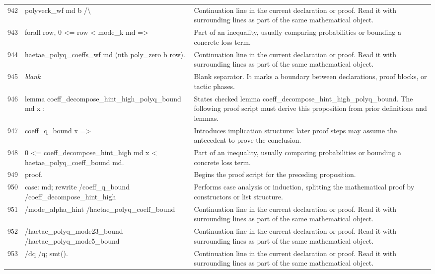 \documentclass[10pt]{article}
\begin{document}
\begin{longtable}{r L{0.53\textwidth} L{0.37\textwidth}}
942 & {\ttfamily\scriptsize   polyveck\_wf md b /\textbackslash{}} & Continuation line in the current declaration or proof.  Read it with surrounding lines as part of the same mathematical object. \\
943 & {\ttfamily\scriptsize   forall row, 0 <= row < mode\_k md =>} & Part of an inequality, usually comparing probabilities or bounding a concrete loss term. \\
944 & {\ttfamily\scriptsize     haetae\_polyq\_coeffs\_wf md (nth poly\_zero b row).} & Continuation line in the current declaration or proof.  Read it with surrounding lines as part of the same mathematical object. \\
945 & {\ttfamily\scriptsize \emph{blank}} & Blank separator.  It marks a boundary between declarations, proof blocks, or tactic phases. \\
946 & {\ttfamily\scriptsize lemma coeff\_decompose\_hint\_high\_polyq\_bound md x :} & States checked lemma coeff\_decompose\_hint\_high\_polyq\_bound.  The following proof script must derive this proposition from prior definitions and lemmas. \\
947 & {\ttfamily\scriptsize   coeff\_q\_bound x =>} & Introduces implication structure: later proof steps may assume the antecedent to prove the conclusion. \\
948 & {\ttfamily\scriptsize   0 <= coeff\_decompose\_hint\_high md x < haetae\_polyq\_coeff\_bound md.} & Part of an inequality, usually comparing probabilities or bounding a concrete loss term. \\
949 & {\ttfamily\scriptsize proof.} & Begins the proof script for the preceding proposition. \\
950 & {\ttfamily\scriptsize case: md; rewrite /coeff\_q\_bound /coeff\_decompose\_hint\_high} & Performs case analysis or induction, splitting the mathematical proof by constructors or list structure. \\
951 & {\ttfamily\scriptsize                   /mode\_alpha\_hint /haetae\_polyq\_coeff\_bound} & Continuation line in the current declaration or proof.  Read it with surrounding lines as part of the same mathematical object. \\
952 & {\ttfamily\scriptsize                   /haetae\_polyq\_mode23\_bound /haetae\_polyq\_mode5\_bound} & Continuation line in the current declaration or proof.  Read it with surrounding lines as part of the same mathematical object. \\
953 & {\ttfamily\scriptsize                   /dq /q; smt().} & Continuation line in the current declaration or proof.  Read it with surrounding lines as part of the same mathematical object. \\

\end{longtable}
\end{document}
